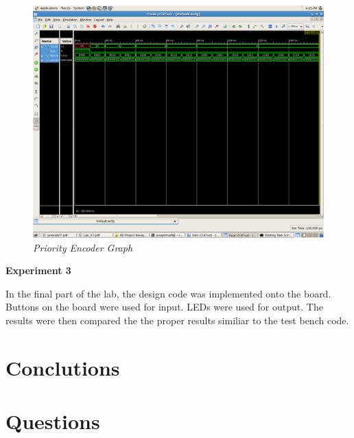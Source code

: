 \documentclass[a4paper,12pt]{article}
\begin{document}
  \newpage

  \begin{figure}[h]
    \begin{center}
      \includegraphics[scale=0.18]{2_3_2.png}
      \caption{\textit{Priority Encoder Graph}}
    \end{center}
  \end{figure}

  \hspace{-15pt}\textbf{Experiment 3}

  \hspace{15pt}In the final part of the lab, the design code was implemented onto
  the board. Buttons on the board were used for input. LEDs were used for output.
  The results were then compared the the proper results similiar to the test
  bench code.

\section*{Conclutions}


\section*{Questions}
\end{document}
